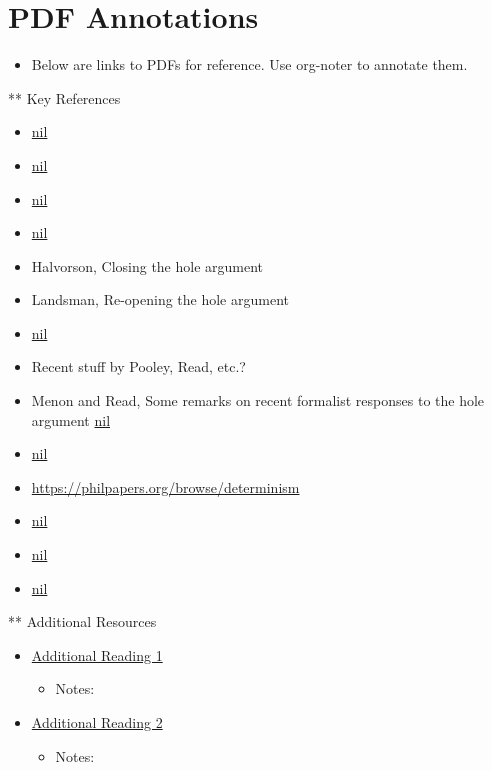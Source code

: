 \documentclass[11pt]{article}
\begin{document}
\section{PDF Annotations}
\label{sec:org925e247}
\begin{itemize}
\item Below are links to PDFs for reference. Use org-noter to annotate them.
\end{itemize}

** Key References
\begin{itemize}
\item \href{file:///Users/hhalvors/bibliotek/Earman, John/primer-determinism.pdf}{nil}
\item \href{file:///Users/hhalvors/bibliotek/Belot, Gordon/Belot-NewWorkCounterpart-1995.pdf}{nil}
\item \href{file:///Users/hhalvors/bibliotek/Belot, Gordon/Determinism and ontology.pdf}{nil}
\item \href{file:///Users/hhalvors/bibliotek/Melia, Joseph/Melia-HolesHaecceitismTwo-1999.pdf}{nil}
\item Halvorson, Closing the hole argument
\item Landsman, Re-opening the hole argument
\item \href{file:///Users/hhalvors/bibliotek/Montague, Richard/deterministic-theories.pdf}{nil}
\item Recent stuff by Pooley, Read, etc.?
\item Menon and Read, Some remarks on recent formalist responses to
the hole argument \href{file:///Users/hhalvors/bibliotek/Read, James/remarks-hole.pdf}{nil}
\item \href{file:///Users/hhalvors/bibliotek/Landsman, Klaas/bohmian-deterministic.pdf}{nil}
\item \url{https://philpapers.org/browse/determinism}
\item \href{file:///Users/hhalvors/bibliotek/Cudek, Franciszek/15BB8552-BC46-11EE-8419-F108F5211B22.pdf}{nil}
\item \href{file:///Users/hhalvors/bibliotek/Brighouse, Carolyn/determinism-modality.pdf}{nil}
\item \href{file:///Users/hhalvors/bibliotek/Brighouse, Carolyn/understanding-indeterminism.pdf}{nil}
\end{itemize}


** Additional Resources
\begin{itemize}
\item \href{file:///Users/hhalvors/bibliotek/additional\_reading\_1.pdf}{Additional Reading 1}
\begin{itemize}
\item Notes:
\end{itemize}
\item \href{file:///Users/hhalvors/bibliotek/additional\_reading\_2.pdf}{Additional Reading 2}
\begin{itemize}
\item Notes:
\end{itemize}
\end{itemize}
\end{document}
